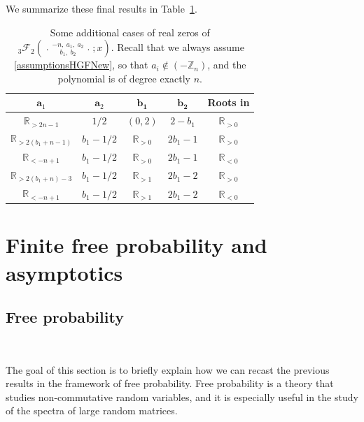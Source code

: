 \documentclass[reqno,11pt]{amsart}
\theoremstyle{remark}
\newcommand{\R}{\mathbb{R}}
\newcommand{\Z}{\mathbb{Z}}
\newcommand{\rr}{\mathbb{R}}
\newcommand*\pFq[5]{%
 {\ }_{#1}{\mathcal F}_{#2}{\left(\genfrac..{0pt}{}{#3}{#4};#5\right)}%
}
\begin{document}
We summarize these final results in Table~\ref{tab:3F2case3extension}. 

\begin{table}[h]
    \centering
    \begin{tabular}{|c|c|c|c|c|}
    \hline $\mathbf{a}_1$ &  $\mathbf{a}_2$ & $\mathbf{b_1}$&$\mathbf{b_2}$ & \textbf{Roots in}  \\
     \hline
$\R_{>2n-1} $ & $1/2$  & $(0,2)$ & $2-b_1$ & $\R_{>0} $  \\
    \hline $  \R_{>2(b_1+n-1)}$  & $ b_1-1/2$ & $\rr_{>0}$   & $2b_1-1$ & $\R_{>0}  $  \\ 
 \hline $  \R_{<-n+1}$  & $ b_1-1/2$ & $\rr_{>0}$   & $2b_1-1$ & $\R_{<0}  $  \\ 
  \hline $  \R_{>2(b_1+n)-3}$ & $ b_1-1/2$ & $\rr_{>1}$   & $2b_1-2$ & $\R_{>0}  $  \\ 
 \hline $  \R_{<-n+1}$ & $ b_1-1/2$  & $\rr_{>1}$   & $2b_1-2$ & $\R_{<0}  $  \\ 
 \hline
\end{tabular}
\vspace{2mm}
\caption{Some additional cases of real zeros of $\pFq{3}{2}{-n,\  a_1,\ a_2}{ b_1,\ b_2}{x}$.  Recall that we always assume \eqref{assumptionsHGFNew}, so that $
  a_i \notin (-\Z_n)$, and the polynomial is of degree exactly $n$.  
  }
    \label{tab:3F2case3extension}
\end{table}


\section{Finite free probability and asymptotics} \label{sec:free.prob.asymototics} 

\subsection{Free probability}
\label{ssec:free} \ 

The goal of this section is to briefly explain how we can recast the previous results in the framework of free probability.
Free probability is a theory that studies non-commutative random variables, and it is especially useful in the study of the spectra of large random matrices. 
\end{document}
